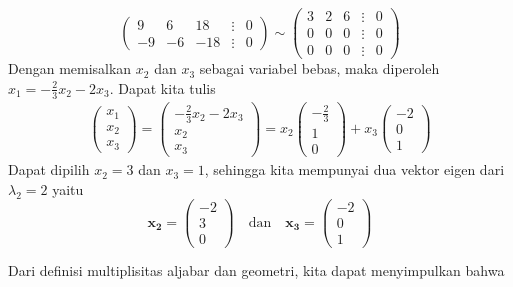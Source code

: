 \documentclass[a4paper]{article}
\theoremstyle{definisi}
\numberwithin{equation}{section}
\begin{document}
\begin{enumerate}
\begin{enumerate}
\begin{itemize}
\begin{equation*}
\begin{pmatrix}
            9&6&18&\vdots&0\\
            -9&-6&-18&\vdots&0
          \end{pmatrix}\sim
          \begin{pmatrix}
            3&2&6&\vdots&0\\
            0&0&0&\vdots&0\\
            0&0&0&\vdots&0
          \end{pmatrix}
        \end{equation*}
        Dengan memisalkan $x_2$ dan $x_3$ sebagai variabel bebas, maka diperoleh $x_1=-\frac{2}{3}x_2-2x_3$. Dapat kita tulis
        \begin{align*}
          \begin{pmatrix}
            x_1\\x_2\\x_3
          \end{pmatrix}=\begin{pmatrix}
            -\frac{2}{3}x_2-2x_3\\x_2\\x_3
          \end{pmatrix}=x_2\begin{pmatrix}
            -\frac{2}{3}\\1\\0
          \end{pmatrix}+x_3\begin{pmatrix}
            -2\\0\\1
          \end{pmatrix}
        \end{align*}
        Dapat dipilih $x_2=3$ dan $x_3=1$, sehingga kita mempunyai dua vektor eigen dari $\lambda_2=2$ yaitu
        \begin{equation*}
          \mathbf{x_2}=\begin{pmatrix}
            -2\\3\\0
          \end{pmatrix}\quad\text{dan}\quad
          \mathbf{x_3}=\begin{pmatrix}
            -2\\0\\1
          \end{pmatrix}
        \end{equation*}
      \end{itemize}
      Dari definisi multiplisitas aljabar dan geometri, kita dapat menyimpulkan bahwa

\end{enumerate}
\end{enumerate}
\end{document}
